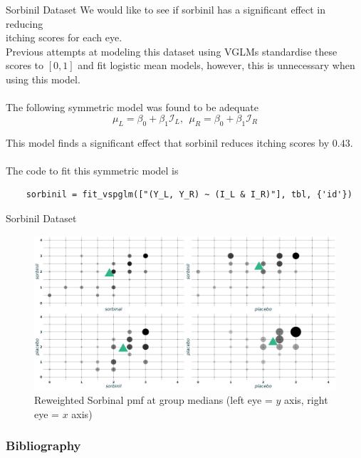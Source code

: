 \documentclass[9pt,notes=hide]{beamer}
\begin{document}
\begin{frame}[fragile]{Sorbinil Dataset}
	We would like to see if sorbinil has a significant effect in reducing\\  
        itching scores for each eye.
	\vspace{0.3cm}\\
	\pause
        Previous attempts at modeling this dataset using VGLMs standardise
        these scores to $[0,1]$ and fit logistic mean models,
	however, this is  unnecessary when using this model. \\
	\pause
	\vspace{0.1cm}\\
	The following symmetric model was found to be adequate
	\[
		\mu_L = \beta_0 + \beta_1 \mathcal{I}_L,  \  \ \mu_R = \beta_0 + \beta_1 \mathcal{I}_R
	\]

	\pause
	This model finds  a significant effect that sorbinil reduces itching scores by $0.43$.\\
	\pause
	\vspace{0.5cm}\\
	The code to fit this symmetric model is
	\begin{verbatim}
    sorbinil = fit_vspglm(["(Y_L, Y_R) ~ (I_L & I_R)"], tbl, {'id'})
 \end{verbatim}
\end{frame}


\begin{frame}{Sorbinil Dataset}
	\begin{figure}
		\centering
		\includegraphics[width= \linewidth]{figures/sorbinil_pmfs.png}
		\caption{{\small Reweighted Sorbinal pmf at group medians (left eye = $y$ axis, right eye = $x$ axis)}}
	\end{figure}
\end{frame}


\begin{frame}[allowframebreaks]
	\frametitle{Bibliography}
	\printbibliography
\end{frame}
\end{document}
